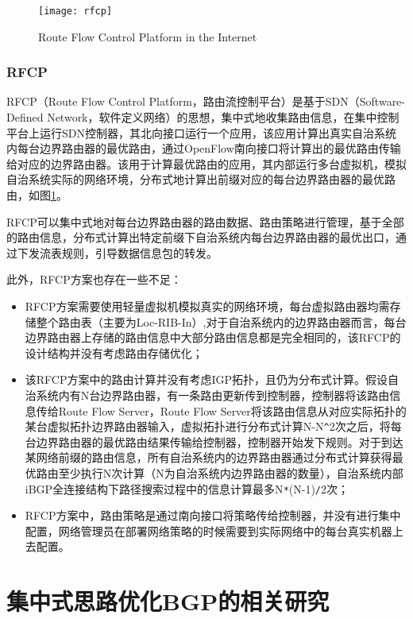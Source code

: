 \begin{figure}
  \centering
  \texttt{[image: rfcp]}
  \caption{Route Flow Control Platform in the Internet\cite{RothenbergHotSDN}}
  \label{fig:rfcp}
\end{figure}

\subsubsection{RFCP\cite{RothenbergHotSDN}}
RFCP（Route Flow Control Platform，路由流控制平台）是基于SDN\cite{sdnsurvey2014ieee}（Software-Defined Network，软件定义网络）的思想，集中式地收集路由信息，在集中控制平台上运行SDN控制器，其北向接口运行一个应用，该应用计算出真实自治系统内每台边界路由器的最优路由，通过OpenFlow\cite{openflow}南向接口将计算出的最优路由传输给对应的边界路由器。该用于计算最优路由的应用，其内部运行多台虚拟机，模拟自治系统实际的网络环境，分布式地计算出前缀对应的每台边界路由器的最优路由，如图\ref{fig:rfcp}。

RFCP可以集中式地对每台边界路由器的路由数据、路由策略进行管理，基于全部的路由信息，分布式计算出特定前缀下自治系统内每台边界路由器的最优出口，通过下发流表规则，引导数据信息包的转发。

此外，RFCP方案也存在一些不足：
\begin{itemize}
\item RFCP方案需要使用轻量虚拟机模拟真实的网络环境，每台虚拟路由器均需存储整个路由表（主要为Loc-RIB-In）,对于自治系统内的边界路由器而言，每台边界路由器上存储的路由信息中大部分路由信息都是完全相同的，该RFCP的设计结构并没有考虑路由存储优化；
\item 该RFCP方案中的路由计算并没有考虑IGP拓扑，且仍为分布式计算。假设自治系统内有N台边界路由器，有一条路由更新传到控制器，控制器将该路由信息传给Route Flow Server，Route Flow Server将该路由信息从对应实际拓扑的某台虚拟拓扑边界路由器输入，虚拟拓扑进行分布式计算N-N\verb+^+2次之后，将每台边界路由器的最优路由结果传输给控制器，控制器开始发下规则。对于到达某网络前缀的路由信息，所有自治系统内的边界路由器通过分布式计算获得最优路由至少执行N次计算（N为自治系统内边界路由器的数量），自治系统内部iBGP全连接结构下路径搜索过程中的信息计算最多N\verb+*+(N-1)\verb+/+2次；
\item RFCP方案中，路由策略是通过南向接口将策略传给控制器，并没有进行集中配置，网络管理员在部署网络策略的时候需要到实际网络中的每台真实机器上去配置。
\end{itemize}

\section{集中式思路优化BGP的相关研究}

